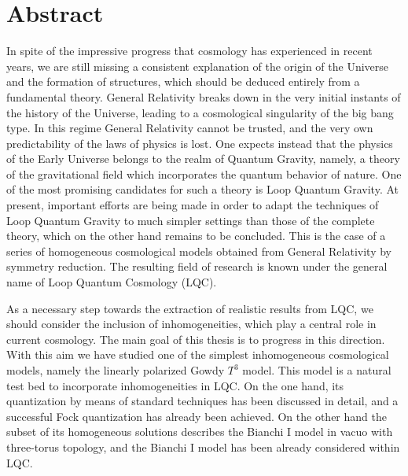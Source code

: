 {\renewcommand{\thechapter}{}\renewcommand{\chaptername}{}
\addtocounter{chapter}{0}
\chapter*{Abstract}}

In spite of the impressive progress that cosmology has experienced in recent years, we are still
missing a consistent explanation of the origin of the Universe and the formation of structures,
which should be deduced entirely from a fundamental theory. General Relativity breaks down in the
very initial instants of the history of the Universe, leading to a cosmological singularity of the
big bang type. In this regime General Relativity cannot be trusted, and the very own predictability
of the laws of physics is lost. One expects instead that the physics of the Early Universe
belongs to the realm of Quantum Gravity, namely, a theory of the gravitational field which
incorporates the quantum behavior of nature. One of the most promising candidates for such a theory
is Loop Quantum Gravity. At present, important efforts are being made in order to adapt the
techniques of Loop Quantum Gravity to much simpler settings than those of the complete theory, which
on the other hand remains to be concluded. This is the case of a series of homogeneous cosmological
models obtained from General Relativity by symmetry reduction. The resulting field of research is
known under the general name of Loop Quantum Cosmology (LQC).

As a necessary step towards the extraction of realistic results from LQC, we should consider the
inclusion of inhomogeneities, which play a central role in current cosmology. The main goal of this
thesis is to progress in this direction. With this aim we have studied one of the simplest
inhomogeneous cosmological models, namely the linearly polarized Gowdy $T^3$ model. This model is a
natural test bed to incorporate inhomogeneities in LQC. On the one hand, its quantization by means
of standard techniques has been discussed in detail, and a successful Fock quantization has
already been achieved. On the other hand the subset of its homogeneous solutions describes the
Bianchi I model in vacuo with three-torus topology, and the Bianchi I model has been already
considered within LQC.

